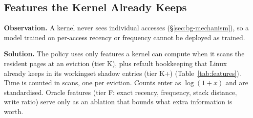 \documentclass{article}
\newcommand{\tierF}{\textsf{F}\xspace}     %
\newcommand{\tierK}{\textsf{K}\xspace}     %
\newcommand{\tierKp}{\textsf{K+}\xspace}   %
\newcommand{\finding}[1]{\textbf{#1}\hspace{0.4em}}
\begin{document}
\subsection{Features the Kernel Already Keeps}
\label{sec:design-features}

\finding{Observation.} A kernel never sees individual accesses
(\S\ref{sec:bg-mechanism}), so a model trained on per-access recency or frequency cannot
be deployed as trained.

\finding{Solution.} The policy uses only features a kernel can compute when it scans the
resident pages at an eviction (tier \tierK), plus refault bookkeeping that Linux already
keeps in its workingset shadow entries (tier \tierKp) (Table~\ref{tab:features}). Time is
counted in scans, one per eviction. Counts enter as $\log(1+x)$ and are standardised.
Oracle features (tier \tierF: exact recency, frequency, stack distance, write ratio)
serve only as an ablation that bounds what extra information is worth.
\end{document}
